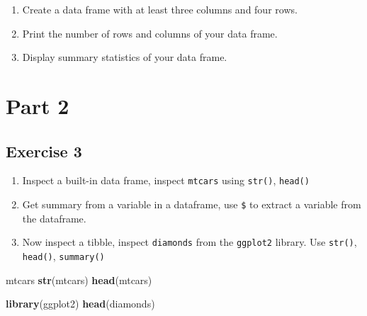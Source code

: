 \documentclass[
]{book}
\newenvironment{Shaded}{\begin{snugshade}}{\end{snugshade}}
\newcommand{\CommentTok}[1]{\textcolor[rgb]{0.56,0.35,0.01}{\textit{#1}}}
\newcommand{\FunctionTok}[1]{\textcolor[rgb]{0.13,0.29,0.53}{\textbf{#1}}}
\newcommand{\NormalTok}[1]{#1}
\newcommand{\SpecialCharTok}[1]{\textcolor[rgb]{0.81,0.36,0.00}{\textbf{#1}}}
\providecommand{\tightlist}{%
  \setlength{\itemsep}{0pt}\setlength{\parskip}{0pt}}
\begin{document}
\begin{enumerate}
\def\labelenumi{\arabic{enumi}.}
\tightlist
\item
  Create a data frame with at least three columns and four rows.
\item
  Print the number of rows and columns of your data frame.
\item
  Display summary statistics of your data frame.
\end{enumerate}

\section*{Part 2}\label{part-2}

\subsection*{Exercise 3}\label{exercise-3}

\begin{enumerate}
\def\labelenumi{\arabic{enumi}.}
\tightlist
\item
  Inspect a built-in data frame, inspect \texttt{mtcars} using \texttt{str()}, \texttt{head()}
\item
  Get summary from a variable in a dataframe, use \texttt{\$} to extract a variable from the dataframe.
\item
  Now inspect a tibble, inspect \texttt{diamonds} from the \texttt{ggplot2} library. Use \texttt{str()}, \texttt{head()}, \texttt{summary()}
\end{enumerate}

\begin{Shaded}
\begin{Highlighting}[]
\NormalTok{mtcars}
\FunctionTok{str}\NormalTok{(mtcars)}
\FunctionTok{head}\NormalTok{(mtcars)}
\end{Highlighting}
\end{Shaded}

\begin{Shaded}
\end{Shaded}

\begin{Shaded}
\begin{Highlighting}[]
\FunctionTok{library}\NormalTok{(ggplot2)}
\FunctionTok{head}\NormalTok{(diamonds)}
\end{Highlighting}
\end{Shaded}
\end{document}
